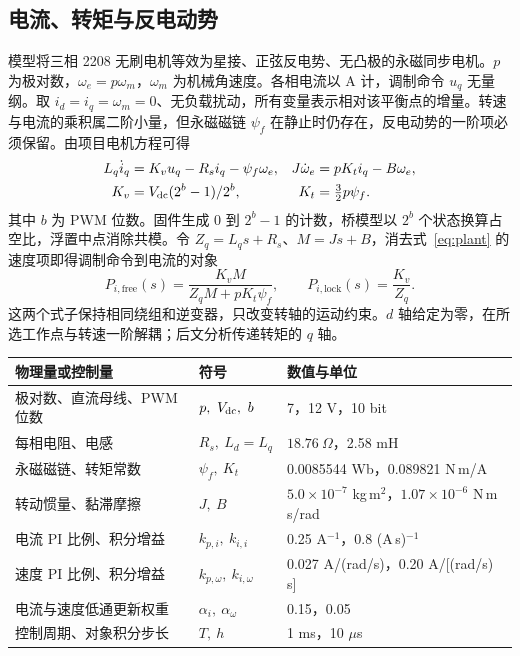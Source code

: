 \documentclass[UTF8,fontset=windows,11pt,a4paper]{ctexart}
\begin{document}
\subsection{电流、转矩与反电动势}
模型将三相 2208 无刷电机等效为星接、正弦反电势、无凸极的永磁同步电机。$p$ 为极对数，$\omega_e=p\omega_m$，$\omega_m$ 为机械角速度。各相电流以 A 计，调制命令 $u_q$ 无量纲。取 $i_d=i_q=\omega_m=0$、无负载扰动，所有变量表示相对该平衡点的增量。转速与电流的乘积属二阶小量，但永磁磁链 $\psi_f$ 在静止时仍存在，反电动势的一阶项必须保留。由项目电机方程可得\cite{model}
\begin{align}
  L_q\dot i_q &= K_vu_q-R_s i_q-\psi_f\omega_e, &
  J\dot\omega_e &= pK_t i_q-B\omega_e, \label{eq:plant}\\
  K_v &= V_{\rm dc}(2^b-1)/2^b, &
  K_t &= \tfrac32p\psi_f . \nonumber
\end{align}
其中 $b$ 为 PWM 位数。固件生成 $0$ 到 $2^b-1$ 的计数，桥模型以 $2^b$ 个状态换算占空比，浮置中点消除共模。令 $Z_q=L_qs+R_s$、$M=Js+B$，消去式~\eqref{eq:plant} 的速度项即得调制命令到电流的对象
\begin{equation}
 P_{i,\mathrm{free}}(s)=\frac{K_v M}{Z_q M+pK_t\psi_f},
 \qquad P_{i,\mathrm{lock}}(s)=\frac{K_v}{Z_q}.\label{eq:free}
\end{equation}
这两个式子保持相同绕组和逆变器，只改变转轴的运动约束。$d$ 轴给定为零，在所选工作点与转速一阶解耦；后文分析传递转矩的 $q$ 轴。

\begin{center}\label{tab:params}
\small\begin{tabular}{@{}lll@{}}\toprule
物理量或控制量 & 符号 & 数值与单位\\\midrule
极对数、直流母线、PWM 位数 & $p,\ V_{\rm dc},\ b$ & 7，12 V，10 bit\\
每相电阻、电感 & $R_s,\ L_d=L_q$ & $18.76~\Omega$，2.58 mH\\
永磁磁链、转矩常数 & $\psi_f,\ K_t$ & 0.0085544 Wb，0.089821 N\,m/A\\
转动惯量、黏滞摩擦 & $J,\ B$ & $5.0\times10^{-7}$ kg\,m$^2$，$1.07\times10^{-6}$ N\,m\,s/rad\\
电流 PI 比例、积分增益 & $k_{p,i},\ k_{i,i}$ & 0.25 A$^{-1}$，0.8 (A\,s)$^{-1}$\\
速度 PI 比例、积分增益 & $k_{p,\omega},\ k_{i,\omega}$ & 0.027 A/(rad/s)，0.20 A/[(rad/s)\,s]\\
电流与速度低通更新权重 & $\alpha_i,\ \alpha_\omega$ & 0.15，0.05\\
控制周期、对象积分步长 & $T,\ h$ & 1 ms，10 $\mu$s\\\bottomrule
\end{tabular}\end{center}
\end{document}
